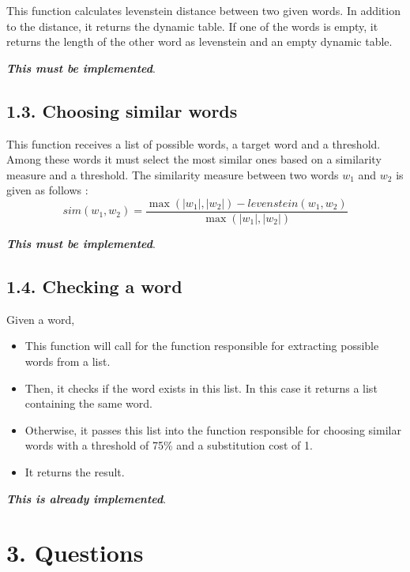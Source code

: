 \documentclass[11pt, a4paper]{article}
\begin{document}
This function calculates levenstein distance between two given words.
In addition to the distance, it returns the dynamic table.
If one of the words is empty, it returns the length of the other word as levenstein and an empty dynamic table.

\textbf{\slshape This must be implemented}.

\subsection*{1.3. Choosing similar words}

This function receives a list of possible words, a target word and a threshold.
Among these words it must select the most similar ones based on a similarity measure and a threshold.
The similarity measure between two words $w_1$ and $w_2$ is given as follows :
\[sim(w_1, w_2) = \frac{\max(|w_1|, |w_2|) - levenstein(w_1, w_2)}{\max(|w_1|, |w_2|)}\]

\textbf{\slshape This must be implemented}.

\subsection*{1.4. Checking a word}

Given a word, 
\begin{itemize}
	\item This function will call for the function responsible for extracting possible words from a list.
	\item Then, it checks if the word exists in this list. In this case it returns a list containing the same word.
	\item Otherwise, it passes this list into the function responsible for choosing similar words with a threshold of 75\% and a substitution cost of 1.
	\item It returns the result.
\end{itemize}

\textbf{\slshape This is already implemented}.

\section*{3. Questions}
\end{document}
